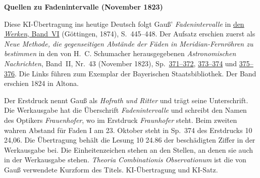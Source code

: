 \clearpage\thispagestyle{empty}
\begin{center}\textbf{Quellen zu Fadenintervalle (November 1823)}\end{center}
\noindent Diese KI-Übertragung ins heutige Deutsch folgt Gauß’ \textit{Fadenintervalle} in \href{https://gdz.sub.uni-goettingen.de/id/PPN236007467}{den \textit{Werken}, Band~VI} (Göttingen, 1874), S.~445--448. Der Aufsatz erschien zuerst als \textit{Neue Methode, die gegenseitigen Abstände der Fäden in Meridian-Fernröhren zu bestimmen} in den von H.~C. Schumacher herausgegebenen \textit{Astronomischen Nachrichten}, Band~II, Nr.~43 (November 1823), Sp.~\href{https://api.digitale-sammlungen.de/iiif/image/v2/bsb10049427_00218/full/1800,/0/default.jpg}{371--372}, \href{https://api.digitale-sammlungen.de/iiif/image/v2/bsb10049427_00219/full/1800,/0/default.jpg}{373--374} und \href{https://api.digitale-sammlungen.de/iiif/image/v2/bsb10049427_00220/full/1800,/0/default.jpg}{375--376}. Die Links führen zum Exemplar der Bayerischen Staatsbibliothek. Der Band erschien 1824 in Altona.
\par\smallskip\noindent Der Erstdruck nennt Gauß als \textit{Hofrath und Ritter} und trägt seine Unterschrift. Die Werkausgabe hat die Überschrift \textit{Fadenintervalle} und schreibt den Namen des Optikers \textit{Frauenhofer}, wo im Erstdruck \textit{Fraunhofer} steht. Beim zweiten wahren Abstand für Faden I am 23. Oktober steht in Sp.~374 des Erstdrucks 10 24,06. Die Übertragung behält die Lesung 10 24.86 der beschädigten Ziffer in der Werkausgabe bei. Die Einheitenzeichen stehen an den Stellen, an denen sie auch in der Werkausgabe stehen. \textit{Theoria Combinationis Observationum} ist die von Gauß verwendete Kurzform des Titels. KI-Übertragung und KI-Satz.
\clearpage
